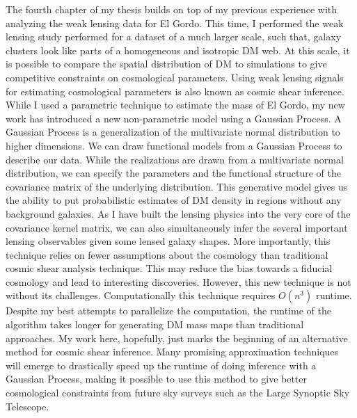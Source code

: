 \documentclass[ucdthesis.tex]{subfiles}
\begin{document}
			The fourth chapter of my thesis builds on top of my previous experience
			with analyzing the weak lensing data for El Gordo. This time, I performed 
			the weak lensing study performed for a dataset of a much larger scale, 
			such that, galaxy
		clusters look like parts of a homogeneous and isotropic DM web. At this scale,
		it is possible to compare the spatial distribution of DM to simulations to give 
		competitive constraints on cosmological parameters. Using weak lensing
		signals for estimating cosmological parameters is also known as cosmic shear 
		inference. While I used a parametric technique to estimate the mass of El Gordo, 
		my new work has introduced a new non-parametric model using a Gaussian Process.
		A Gaussian Process is a generalization of the multivariate normal distribution 
		to higher dimensions. We can draw functional models from a Gaussian Process
		to describe our data. While the realizations are drawn from a multivariate
		normal distribution,  we can specify the parameters and the
		functional structure of the covariance matrix of the underlying 
		distribution. 
		This generative model gives us the ability to put probabilistic estimates 
		of DM density in regions without any background galaxies. 
		As I have built the lensing physics into the 
		very core of the covariance kernel matrix, we can also simultaneously infer the
		several important lensing observables given some lensed galaxy shapes. 
		More importantly, this technique relies on fewer assumptions about the
		cosmology than traditional cosmic shear analysis technique. This may reduce
		the bias towards a fiducial cosmology and lead to interesting discoveries.
		However, this new technique is not without its challenges. Computationally
		this technique requires $O(n^3)$ runtime. Despite my best attempts to
		parallelize the computation, the runtime of the algorithm takes longer for
	  generating DM mass maps than traditional approaches. My work here,
		hopefully, just marks the beginning of an alternative method for cosmic
		shear inference. Many promising approximation techniques will emerge to 
		drastically speed up the runtime of doing inference with a Gaussian Process,
		making it possible to use this method to give better cosmological constraints  
		from future sky surveys such as the Large Synoptic Sky Telescope.  

		


\end{document}
